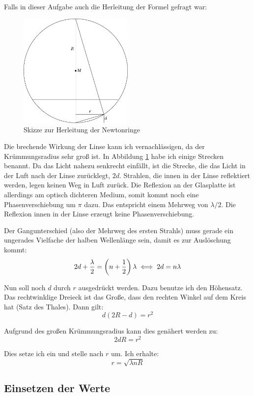 Falls in dieser Aufgabe auch die Herleitung der Formel gefragt war:
\cite{wikipedia-newtonringe}

\begin{figure}
	\centering
	\includegraphics[width=0.5\textwidth]{27-Skizze.pdf}
	\caption{Skizze zur Herleitung der Newtonringe}
	\label{fig:newton}
\end{figure}

Die brechende Wirkung der Linse kann ich vernachlässigen, da der
Krümmungsradius sehr groß ist. In Abbildung \ref{fig:newton} habe ich einige
Strecken benannt. Da das Licht nahezu senkrecht einfällt, ist die Strecke, die
das Licht in der Luft nach der Linse zurücklegt, $2 d$. Strahlen, die innen
in der Linse reflektiert werden, legen keinen Weg in Luft zurück. Die Reflexion
an der Glasplatte ist allerdings am optisch dichteren Medium, somit kommt noch
eine Phasenverschiebung um $\pi$ dazu. Das entspricht einem Mehrweg von
$\lambda/2$.  Die Reflexion innen in der Linse erzeugt keine
Phasenverschiebung.

Der Gangunterschied (also der Mehrweg des ersten Strahls) muss gerade ein
ungerades Vielfache der halben Wellenlänge sein, damit es zur Auslöschung
kommt:
\[
	2d + \frac \lambda 2 = \del{n + \half} \lambda
	\iff
	2d = n \lambda
\]

Nun soll noch $d$ durch $r$ ausgedrückt werden. Dazu benutze ich den Höhensatz.
Das rechtwinklige Dreieck ist das Große, dass den rechten Winkel auf dem Kreis
hat (Satz des Thales). Dann gilt:
\[
	d (2R - d) = r^2
\]

Aufgrund des großen Krümmungsradius kann dies genähert werden zu:
\[
	2dR = r^2
\]

Dies setze ich ein und stelle nach $r$ um. Ich erhalte:
\[
	r = \sqrt{\lambda n R}
\]

\subsection{Einsetzen der Werte}


